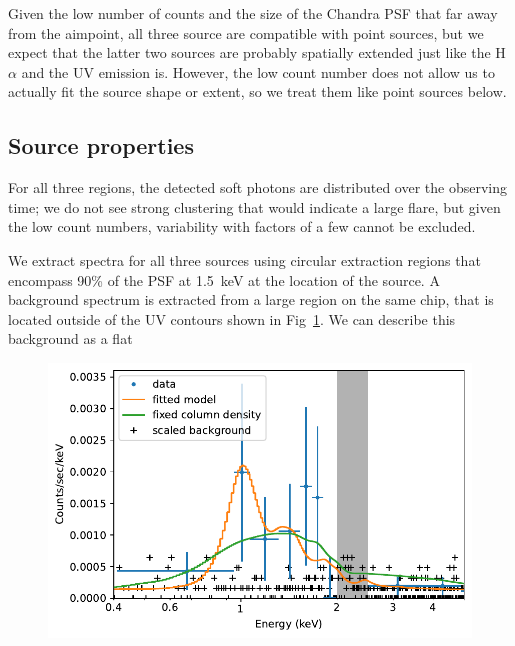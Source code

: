\documentclass[linenumbers]{aastex631}
\begin{document}
Given the low number of counts and the size of the Chandra PSF that far away from the aimpoint, all three source are compatible with point sources, but we expect that the latter two sources are probably spatially extended just like the H$\alpha$ and the UV emission is. However, the low count number does not allow us to actually fit the source shape or extent, so we treat them like point sources below. 

\subsection{Source properties}
For all three regions, the detected soft photons are distributed over the observing time; we do not see strong clustering that would indicate a large flare, but given the low count numbers, variability with factors of a few cannot be excluded.

We extract spectra for all three sources using circular extraction regions that encompass 90\% of the PSF at 1.5~keV at the location of the source. A background spectrum is extracted from a large region on the same chip, that is located outside of the UV contours shown in Fig~\ref{fig:chandraimage}. We can describe this background as a flat 

\begin{figure}
    \centering
    \includegraphics[width=\textwidth]{figures/TYC_spec.pdf}
    \caption{}
    \label{fig:chandraimage}
\end{figure}
\end{document}
